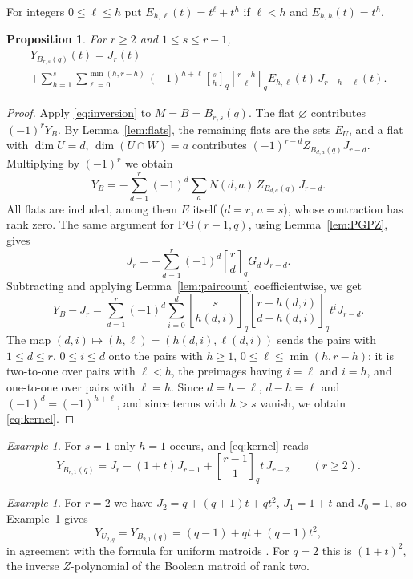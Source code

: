 \documentclass{amsart}
\newtheorem{proposition}[theorem]{Proposition}
\theoremstyle{remark}
\newtheorem{example}[theorem]{Example}
\numberwithin{equation}{section}
\newcommand{\qbinom}[3]{\genfrac{[}{]}{0pt}{}{#1}{#2}_{#3}}
\newcommand{\PG}{\mathrm{PG}}
\begin{document}
For integers $0\le \ell\le h$ put $E_{h,\ell}(t)=t^\ell+t^h$ if $\ell<h$ and $E_{h,h}(t)=t^h$.

\begin{proposition}\label{prop:kernel}
For $r\ge2$ and $1\le s\le r-1$,
\begin{multline}\label{eq:kernel}
  Y_{B_{r,s}(q)}(t)=J_r(t)\\
  +\sum_{h=1}^{s}\sum_{\ell=0}^{\min(h,r-h)}(-1)^{h+\ell}\qbinom{s}{h}{q}\qbinom{r-h}{\ell}{q}E_{h,\ell}(t)\,J_{r-h-\ell}(t).
\end{multline}
\end{proposition}

\begin{proof}
Apply \eqref{eq:inversion} to $M=B=B_{r,s}(q)$. The flat $\varnothing$ contributes $(-1)^rY_B$. By Lemma~\ref{lem:flats}, the remaining flats are the sets $E_U$, and a flat with $\dim U=d$, $\dim(U\cap W)=a$ contributes $(-1)^{r-d}Z_{B_{d,a}(q)}J_{r-d}$. Multiplying by $(-1)^r$ we obtain
\begin{equation}\label{eq:YB}
  Y_B=-\sum_{d=1}^{r}(-1)^d\sum_aN(d,a)\,Z_{B_{d,a}(q)}\,J_{r-d}.
\end{equation}
All flats are included, among them $E$ itself ($d=r$, $a=s$), whose contraction has rank zero. The same argument for $\PG(r-1,q)$, using Lemma~\ref{lem:PGPZ}, gives
\[
  J_r=-\sum_{d=1}^{r}(-1)^d\qbinom{r}{d}{q}G_d\,J_{r-d}.
\]
Subtracting and applying Lemma~\ref{lem:paircount} coefficientwise, we get
\[
  Y_B-J_r=\sum_{d=1}^{r}(-1)^d\sum_{i=0}^{d}\qbinom{s}{h(d,i)}{q}\qbinom{r-h(d,i)}{d-h(d,i)}{q}t^i J_{r-d}.
\]
The map $(d,i)\mapsto(h,\ell)=(h(d,i),\ell(d,i))$ sends the pairs with $1\le d\le r$, $0\le i\le d$ onto the pairs with $h\ge1$, $0\le\ell\le\min(h,r-h)$; it is two-to-one over pairs with $\ell<h$, the preimages having $i=\ell$ and $i=h$, and one-to-one over pairs with $\ell=h$. Since $d=h+\ell$, $d-h=\ell$ and $(-1)^d=(-1)^{h+\ell}$, and since terms with $h>s$ vanish, we obtain \eqref{eq:kernel}.
\end{proof}

\begin{example}\label{ex:s1}
For $s=1$ only $h=1$ occurs, and \eqref{eq:kernel} reads
\[
  Y_{B_{r,1}(q)}=J_r-(1+t)J_{r-1}+\qbinom{r-1}{1}{q}t\,J_{r-2}\qquad(r\ge2).
\]
\end{example}

\begin{example}\label{ex:rank2}
For $r=2$ we have $J_2=q+(q+1)t+qt^2$, $J_1=1+t$ and $J_0=1$, so Example~\ref{ex:s1} gives
\[
  Y_{U_{2,q}}=Y_{B_{2,1}(q)}=(q-1)+qt+(q-1)t^2,
\]
in agreement with the formula for uniform matroids \cite[Theorem~1.1]{GRX}. For $q=2$ this is $(1+t)^2$, the inverse $Z$-polynomial of the Boolean matroid of rank two.
\end{example}
\end{document}
